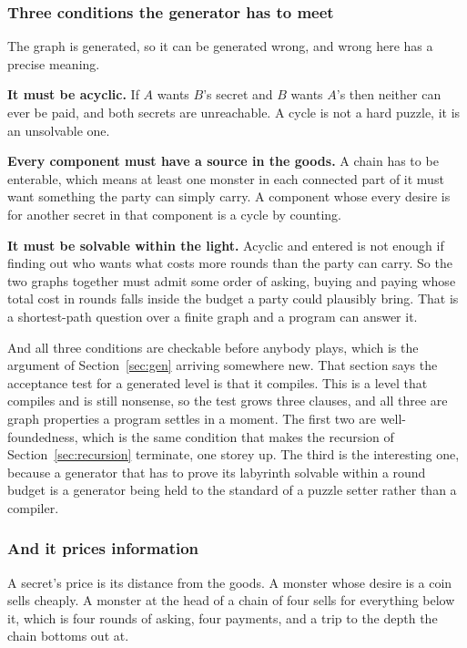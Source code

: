 \documentclass[11pt,a4paper]{article}
\begin{document}
\subsubsection*{Three conditions the generator has to meet}

The graph is generated, so it can be generated wrong, and wrong here has a precise meaning.

\textbf{It must be acyclic.} If $A$ wants $B$'s secret and $B$ wants $A$'s then neither can ever be
paid, and both secrets are unreachable. A cycle is not a hard puzzle, it is an unsolvable one.

\textbf{Every component must have a source in the goods.} A chain has to be enterable, which means
at least one monster in each connected part of it must want something the party can simply carry.
A component whose every desire is for another secret in that component is a cycle by counting.

\textbf{It must be solvable within the light.} Acyclic and entered is not enough if finding out
who wants what costs more rounds than the party can carry. So the two graphs together must admit
some order of asking, buying and paying whose total cost in rounds falls inside the budget a party
could plausibly bring. That is a shortest-path question over a finite graph and a program can
answer it.

\begin{sectionbox}
And all three conditions are checkable before anybody plays, which is the argument of
Section~\ref{sec:gen} arriving somewhere new. That section says the acceptance test for a
generated level is that it compiles. This is a level that compiles and is still nonsense, so the
test grows three clauses, and all three are graph properties a program settles in a moment. The
first two are well-foundedness, which is the same condition that makes the recursion of
Section~\ref{sec:recursion} terminate, one storey up. The third is the interesting one, because a
generator that has to prove its labyrinth solvable within a round budget is a generator being held
to the standard of a puzzle setter rather than a compiler.
\end{sectionbox}

\subsubsection*{And it prices information}

A secret's price is its distance from the goods. A monster whose desire is a coin sells cheaply. A
monster at the head of a chain of four sells for everything below it, which is four rounds of
asking, four payments, and a trip to the depth the chain bottoms out at.
\end{document}
